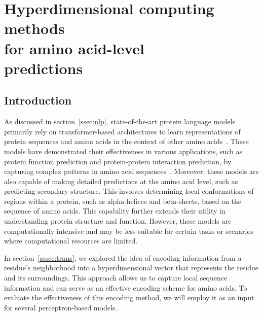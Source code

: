 \chapter[Hyperdimensional computing methods for amino acid-levelp redictions]{Hyperdimensional computing methods\\for amino acid-level\\predictions}
\section{Introduction}
As discussed in section~\ref{ssec:nlp}, state-of-the-art protein language models primarily rely on transformer-based architectures to learn representations of protein sequences and amino acids in the context of other amino acids~\cite{reveiw}. These models have demonstrated their effectiveness in various applications, such as protein function prediction and protein-protein interaction prediction, by capturing complex patterns in amino acid sequences~\cite{esm2}. Moreover, these models are also capable of making detailed predictions at the amino acid level, such as predicting secondary structure. This involves determining local conformations of regions within a protein, such as alpha-helices and beta-sheets, based on the sequence of amino acids. This capability further extends their utility in understanding protein structure and function. However, these models are computationally intensive and may be less suitable for certain tasks or scenarios where computational resources are limited.

In section~\ref{sssec:trans}, we explored the idea of encoding information from a residue's neighborhood into a hyperdimensional vector that represents the residue and its surroundings. This approach allows us to capture local sequence information and can serve as an effective encoding scheme for amino acids. To evaluate the effectiveness of this encoding method, we will employ it as an input for several perceptron-based models.

